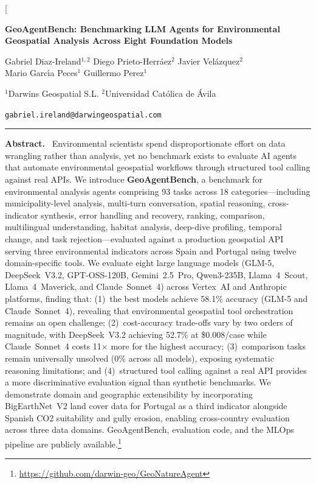 \documentclass[10pt,twocolumn]{article}
\begin{document}
\twocolumn[
\begin{@twocolumnfalse}
\begin{center}
{\LARGE\bfseries GeoAgentBench: Benchmarking LLM Agents for Environmental\\[3pt] Geospatial Analysis Across Eight Foundation Models\par}
\vspace{12pt}
{\large Gabriel Diaz-Ireland$^{1,2}$ \quad Diego Prieto-Herr\'{a}ez$^{2}$ \quad Javier Vel\'{a}zquez$^{2}$\\[4pt] Mario Garc\'{\i}a Peces$^{1}$ \quad Guillermo Perez$^{1}$\par}
\vspace{6pt}
{\normalsize $^{1}$Darwins Geospatial S.L. \quad $^{2}$Universidad Cat\'{o}lica de \'{A}vila\par}
\vspace{4pt}
{\small\texttt{gabriel.ireland@darwingeospatial.com}\par}
\vspace{14pt}
\end{center}

\noindent\rule{\textwidth}{0.4pt}
\vspace{4pt}
\noindent\textbf{Abstract.}~
Environmental scientists spend disproportionate effort on data wrangling rather than analysis, yet no benchmark exists to evaluate AI agents that automate environmental geospatial workflows through structured tool calling against real APIs. We introduce \textbf{GeoAgentBench}, a benchmark for environmental analysis agents comprising 93 tasks across 18 categories---including municipality-level analysis, multi-turn conversation, spatial reasoning, cross-indicator synthesis, error handling and recovery, ranking, comparison, multilingual understanding, habitat analysis, deep-dive profiling, temporal change, and task rejection---evaluated against a production geospatial API serving three environmental indicators across Spain and Portugal using twelve domain-specific tools. We evaluate eight large language models (GLM-5, DeepSeek~V3.2, GPT-OSS-120B, Gemini~2.5~Pro, Qwen3-235B, Llama~4~Scout, Llama~4~Maverick, and Claude~Sonnet~4) across Vertex~AI and Anthropic platforms, finding that: (1)~the best models achieve 58.1\% accuracy (GLM-5 and Claude~Sonnet~4), revealing that environmental geospatial tool orchestration remains an open challenge;
(2)~cost-accuracy trade-offs vary by two orders of magnitude, with DeepSeek~V3.2 achieving 52.7\% at \$0.008/case while Claude~Sonnet~4 costs 11$\times$ more for the highest accuracy; (3)~comparison tasks remain universally unsolved (0\% across all models), exposing systematic reasoning limitations; and (4)~structured tool calling against a real API provides a more discriminative evaluation signal than synthetic benchmarks. We demonstrate domain and geographic extensibility by incorporating BigEarthNet~V2 land cover data for Portugal as a third indicator alongside Spanish CO2 suitability and gully erosion, enabling cross-country evaluation across three data domains. GeoAgentBench, evaluation code, and the MLOps pipeline are publicly available.\footnote{\url{https://github.com/darwin-geo/GeoNatureAgent}}


\end{@twocolumnfalse}
\end{document}
